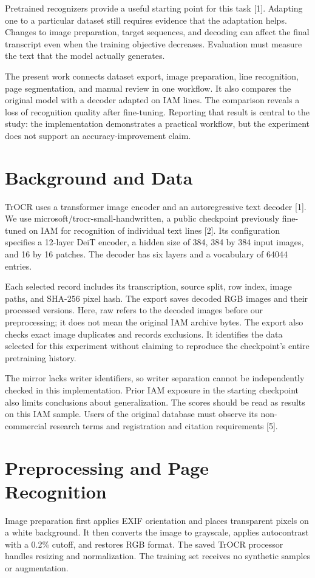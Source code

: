 \documentclass[conference]{IEEEtran}
\begin{document}
Pretrained recognizers provide a useful starting point for this task [1]. Adapting one to a particular dataset still requires evidence that the adaptation helps. Changes to image preparation, target sequences, and decoding can affect the final transcript even when the training objective decreases. Evaluation must measure the text that the model actually generates.

The present work connects dataset export, image preparation, line recognition, page segmentation, and manual review in one workflow. It also compares the original model with a decoder adapted on IAM lines. The comparison reveals a loss of recognition quality after fine-tuning. Reporting that result is central to the study: the implementation demonstrates a practical workflow, but the experiment does not support an accuracy-improvement claim.
\section{Background and Data}
TrOCR uses a transformer image encoder and an autoregressive text decoder [1]. We use microsoft/trocr-small-handwritten, a public checkpoint previously fine-tuned on IAM for recognition of individual text lines [2]. Its configuration specifies a 12-layer DeiT encoder, a hidden size of 384, 384 by 384 input images, and 16 by 16 patches. The decoder has six layers and a vocabulary of 64044 entries.


Each selected record includes its transcription, source split, row index, image paths, and SHA-256 pixel hash. The export saves decoded RGB images and their processed versions. Here, raw refers to the decoded images before our preprocessing; it does not mean the original IAM archive bytes. The export also checks exact image duplicates and records exclusions. It identifies the data selected for this experiment without claiming to reproduce the checkpoint's entire pretraining history.

The mirror lacks writer identifiers, so writer separation cannot be independently checked in this implementation. Prior IAM exposure in the starting checkpoint also limits conclusions about generalization. The scores should be read as results on this IAM sample. Users of the original database must observe its non-commercial research terms and registration and citation requirements [5].
\section{Preprocessing and Page Recognition}
Image preparation first applies EXIF orientation and places transparent pixels on a white background. It then converts the image to grayscale, applies autocontrast with a 0.2\% cutoff, and restores RGB format. The saved TrOCR processor handles resizing and normalization. The training set receives no synthetic samples or augmentation.
\end{document}
